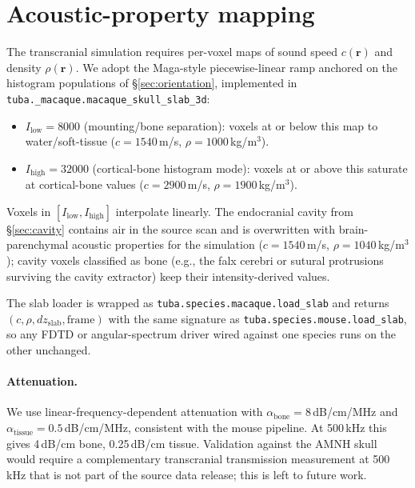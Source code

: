 \documentclass{compactarticle}
\begin{document}
\section{Acoustic-property mapping}
\label{sec:acoustic-mapping}

The transcranial simulation requires per-voxel maps of sound speed
$c(\mathbf{r})$ and density $\rho(\mathbf{r})$. We adopt the Maga-style
piecewise-linear ramp anchored on the histogram populations of
\S\ref{sec:orientation}, implemented in
\texttt{tuba.\_macaque.\allowbreak macaque\_\allowbreak skull\_slab\_3d}:
\begin{itemize}[leftmargin=*]
\setlength\itemsep{0pt}
  \item $I_{\mathrm{low}} = 8000$ (mounting/bone separation): voxels at
        or below this map to water/soft-tissue
        ($c = 1540$\,m/s, $\rho = 1000$\,kg/m$^3$).
  \item $I_{\mathrm{high}} = 32000$ (cortical-bone histogram mode):
        voxels at or above this saturate at cortical-bone values
        ($c = 2900$\,m/s, $\rho = 1900$\,kg/m$^3$).
\end{itemize}
Voxels in $[I_{\mathrm{low}}, I_{\mathrm{high}}]$ interpolate linearly.
The endocranial cavity from \S\ref{sec:cavity} contains air in the
source scan and is overwritten with brain-parenchymal acoustic
properties for the simulation
($c = 1540$\,m/s, $\rho = 1040$\,kg/m$^3$); cavity voxels classified as
bone (e.g., the falx cerebri or sutural protrusions surviving the
cavity extractor) keep their intensity-derived values.

The slab loader is wrapped as
\texttt{tuba.species.\allowbreak macaque.\allowbreak load\_slab} and
returns $(c, \rho, dz_{\mathrm{slab}}, \mathrm{frame})$ with the same
signature as \texttt{tuba.species.\allowbreak mouse.\allowbreak load\_slab},
so any FDTD or angular-spectrum driver wired against one species runs
on the other unchanged.

\paragraph{Attenuation.}
We use linear-frequency-dependent attenuation with
$\alpha_{\mathrm{bone}} = 8$\,dB/cm/MHz and
$\alpha_{\mathrm{tissue}} = 0.5$\,dB/cm/MHz, consistent with the mouse
pipeline. At 500\,kHz this gives 4\,dB/cm bone, 0.25\,dB/cm tissue.
Validation against the AMNH skull would require a complementary
transcranial transmission measurement at 500\,kHz that is not part of
the source data release; this is left to future work.
\end{document}
